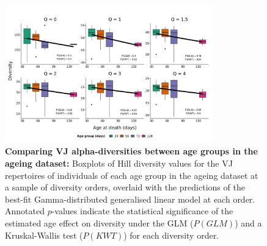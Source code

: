 \begin{figure}
\centering
\includegraphics[width = 0.8\textwidth]{_Figures/png/ageing-VJ-diversity-solo-fit-gamma}
\caption[Comparing VJ alpha-diversities between age groups in the \igseq ageing dataset]{\textbf{Comparing VJ alpha-diversities between age groups in the \igseq ageing dataset:} Boxplots of Hill diversity values for the VJ repertoires of individuals of each age group in the \igseq ageing dataset at a sample of diversity orders, overlaid with the predictions of the best-fit Gamma-distributed generalised linear model at each order.  Annotated $p$-values indicate the statistical significance of the estimated age effect on diversity under the GLM ($P(GLM)$) and a Kruskal-Wallis test ($P(KWT)$) for each diversity order.}
\label{fig:igseq-ageing-VJ-diversity-solo-fit-gamma}
\end{figure}

